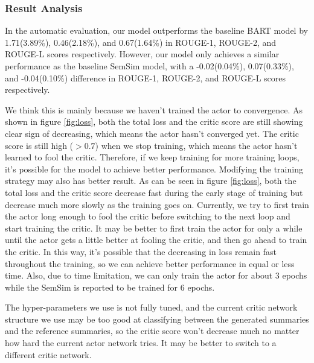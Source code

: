 \documentclass[11pt,a4paper]{article}
\begin{document}
\subsubsection{Result Analysis}

In the automatic evaluation, our model outperforms the baseline BART model by 1.71(3.89\%), 0.46(2.18\%), and 0.67(1.64\%) in ROUGE-1, ROUGE-2, and ROUGE-L scores respectively. However, our model only achieves a similar performance as the baseline SemSim model, with a -0.02(0.04\%), 0.07(0.33\%), and -0.04(0.10\%) difference in ROUGE-1, ROUGE-2, and ROUGE-L scores respectively. 

We think this is mainly because we haven't trained the actor to convergence. As shown in figure \ref{fig:loss}, both the total loss and the critic score are still showing clear sign of decreasing, which means the actor hasn't converged yet. The critic score is still high ($>0.7$) when we stop training, which means the actor hasn't learned to fool the critic. Therefore, if we keep training for more training loops, it's possible for the model to achieve better performance. Modifying the training strategy may also has better result. As can be seen in figure \ref{fig:loss}, both the total loss and the critic score decrease fast during the early stage of training but decrease much more slowly as the training goes on. Currently, we try to first train the actor long enough to fool the critic before switching to the next loop and start training the critic. It may be better to first train the actor for only a while until the actor gets a little better at fooling the critic, and then go ahead to train the critic. In this way, it's possible that the decreasing in loss remain fast throughout the training, so we can achieve better performance in equal or less time. Also, due to time limitation, we can only train the actor for about 3 epochs while the SemSim is reported to be trained for 6 epochs.

The hyper-parameters we use is not fully tuned, and the current critic network structure we use may be too good at classifying between the generated summaries and the reference summaries, so the critic score won't decrease much no matter how hard the current actor network tries. It may be better to switch to a different critic network.
\end{document}
